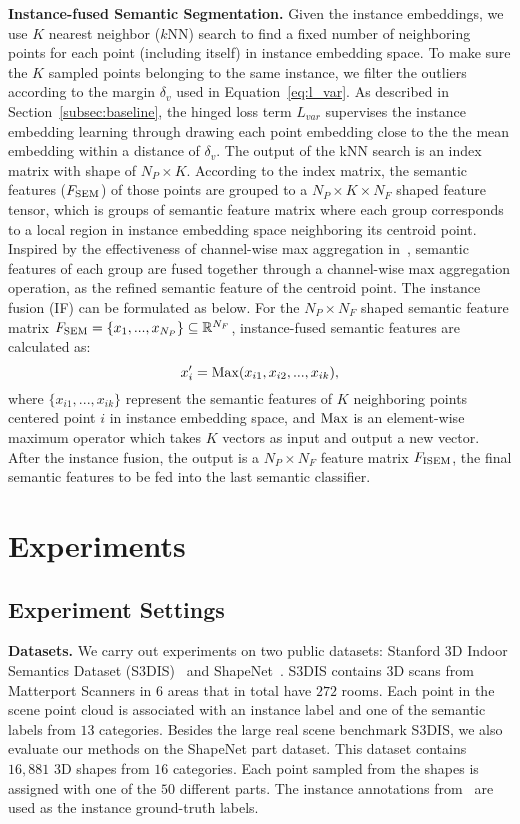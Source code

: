 \documentclass[10pt,twocolumn,letterpaper]{article}
\newcommand{\myparagraph}[1]{{\vspace{0.5em} \noindent \bf #1}}
\begin{document}
\myparagraph{Instance-fused Semantic Segmentation.}
Given the instance embeddings, we use $K$ nearest neighbor ($k$NN) search to find a fixed number of neighboring points for each point (including itself) in instance embedding space. 
To make sure the $K$ sampled points belonging to the same instance, 
we filter the outliers according to the margin $\delta_{v}$ used in Equation~\ref{eq:l_var}.
As described in Section~\ref{subsec:baseline}, the hinged loss term $L_{var}$ supervises the instance embedding learning through drawing each point embedding close to the the mean embedding within a distance of $\delta_{v}$.
The output of the kNN search is an index matrix with shape of $N_P \times K$.
According to the index matrix, the semantic features ($F_{\rm SEM}$) of those points are grouped to a $N_P \times K \times N_{F}$ shaped feature tensor, which is groups of semantic feature matrix where each group corresponds to a local region in instance embedding space neighboring its centroid point.
Inspired by the effectiveness of channel-wise max aggregation in~\cite{Qi_2017_CVPR,dgcnn,Ye_2018_ECCV}, semantic features of each group are fused together through a channel-wise max aggregation operation, as the refined semantic feature of the centroid point.
The instance fusion (IF) can be formulated as below. For the $ N_P \times N_{F}$ shaped semantic feature matrix $F_{\rm SEM} = \{ x_1, ..., x_{N_P} \} \subseteq \mathbb{R}^{N_F} $, instance-fused semantic features are calculated as:
\begin{equation}
    x_{i}^{\prime} = {\rm Max}(x_{i1}, x_{i2}, ..., x_{ik}),
\end{equation}
where $\{x_{i1}, ..., x_{ik} \}$ represent the semantic features of $K$ neighboring points centered point $i$ in instance embedding space, and $\rm Max$ is an element-wise maximum operator which takes $K$ vectors as input and output a new vector. 
After the instance fusion, the output is a $N_P \times N_{F}$ feature matrix $F_{\rm ISEM}$, the final semantic features to be fed into the last semantic classifier.


\section{Experiments}

\subsection{Experiment Settings}
\myparagraph{Datasets.}
We carry out experiments on two public datasets: Stanford 3D Indoor Semantics Dataset (S3DIS)~\cite{s3dis} and ShapeNet~\cite{shapenet}. 
S3DIS contains 3D scans from Matterport Scanners in $6$ areas that in total have $272$ rooms.
Each point in the scene point cloud is associated with an instance label and one of the semantic labels from $13$ categories.
Besides the large real scene benchmark S3DIS, we also evaluate our methods on the ShapeNet part dataset.
This dataset contains $16,881$ 3D shapes from $16$ categories. Each point sampled from the shapes is assigned with one of the $50$ different parts. The instance annotations from~\cite{sgpn} are used as the instance ground-truth labels.
\end{document}
